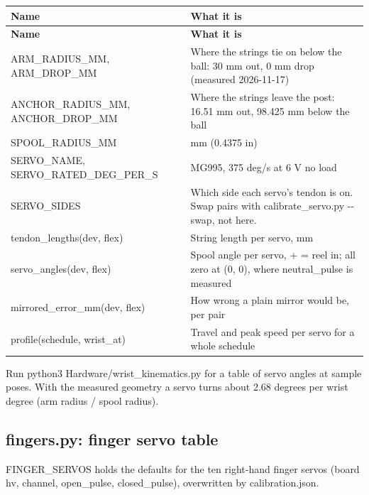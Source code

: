 \documentclass[11pt,letterpaper]{article}
\newcommand{\code}[1]{\textcolor{codeblue}{\ttfamily\smaller\relax #1}}
\begin{document}
{\small
\begin{longtable}{|>{\raggedright\arraybackslash}p{}|>{\raggedright\arraybackslash}p{}|}
\hline
\rowcolor{tblhead}\textbf{Name} & \textbf{What it is} \\ \hline
\endfirsthead
\hline
\rowcolor{tblhead}\textbf{Name} & \textbf{What it is} \\ \hline
\endhead
\code{ARM\_\allowbreak{}RADIUS\_\allowbreak{}MM}, \code{ARM\_\allowbreak{}DROP\_\allowbreak{}MM} & Where the strings tie on below the ball: 30 mm out, 0 mm drop (measured 2026-11-17) \\ \hline
\code{ANCHOR\_\allowbreak{}RADIUS\_\allowbreak{}MM}, \code{ANCHOR\_\allowbreak{}DROP\_\allowbreak{}MM} & Where the strings leave the post: 16.51 mm out, 98.425 mm below the ball \\ \hline
\code{SPOOL\_\allowbreak{}RADIUS\_\allowbreak{}MM} & 11.1125 mm (0.4375 in) \\ \hline
\code{SERVO\_\allowbreak{}NAME}, \code{SERVO\_\allowbreak{}RATED\_\allowbreak{}DEG\_\allowbreak{}PER\_\allowbreak{}S} & MG995, 375 deg/s at 6 V no load \\ \hline
\code{SERVO\_\allowbreak{}SIDES} & Which side each servo's tendon is on. Swap pairs with \code{calibrate\_\allowbreak{}servo.py -{}-{}swap}, not here. \\ \hline
\code{tendon\_\allowbreak{}lengths(dev,\allowbreak{} flex)} & String length per servo, mm \\ \hline
\code{servo\_\allowbreak{}angles(dev,\allowbreak{} flex)} & Spool angle per servo, + = reel in; all zero at (0, 0), where \code{neutral\_\allowbreak{}pulse} is measured \\ \hline
\code{mirrored\_\allowbreak{}error\_\allowbreak{}mm(dev,\allowbreak{} flex)} & How wrong a plain mirror would be, per pair \\ \hline
\code{profile(schedule,\allowbreak{} wrist\_\allowbreak{}at)} & Travel and peak speed per servo for a whole schedule \\ \hline
\end{longtable}}

Run \code{python3 Hardware/\allowbreak{}wrist\_\allowbreak{}kinematics.py} for a table of servo angles at sample poses. With the measured geometry a servo turns about 2.68 degrees per wrist degree (arm radius / spool radius).


\subsection{fingers.py: finger servo table}
\code{FINGER\_\allowbreak{}SERVOS} holds the defaults for the ten right-hand finger servos (board \code{hv}, channel, \code{open\_\allowbreak{}pulse}, \code{closed\_\allowbreak{}pulse}), overwritten by \code{calibration.json}.
\end{document}
